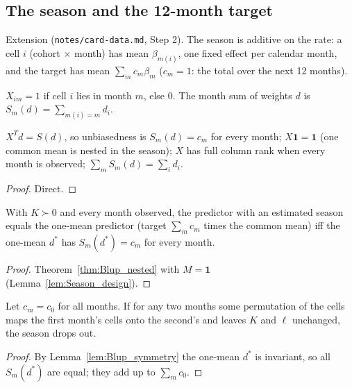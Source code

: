 \subsection*{The season and the 12-month target}

Extension (\texttt{notes/card-data.md}, Step 2). The season is additive on the rate: a cell
$i$ (cohort $\times$ month) has mean $\beta_{m(i)}$, one fixed effect per calendar month, and the
target has mean $\sum_m c_m\beta_m$ ($c_m = 1$: the total over the next 12 months).

\begin{definition}\label{def:Season}
  \leanok
  $X_{im} = 1$ if cell $i$ lies in month $m$, else $0$. The month sum of weights $d$ is
  $S_m(d) = \sum_{m(i) = m} d_i$.
\end{definition}

\begin{lemma}\label{lem:Season_design}
  \leanok
  $X^Td = S(d)$, so unbiasedness is $S_m(d) = c_m$ for every month; $X\mathbf 1 = \mathbf 1$
  (one common mean is nested in the season); $X$ has full column rank when every month is
  observed; $\sum_m S_m(d) = \sum_i d_i$.
\end{lemma}
\begin{proof}
  \leanok
  Direct.
\end{proof}

\begin{theorem}\label{thm:Season_eq_iff}
  \leanok
  With $K \succ 0$ and every month observed, the predictor with an estimated season equals the
  one-mean predictor (target $\sum_m c_m$ times the common mean) iff the one-mean $d^*$ has
  $S_m(d^*) = c_m$ for every month.
\end{theorem}
\begin{proof}
  \leanok
  Theorem~\ref{thm:Blup_nested} with $M = \mathbf 1$ (Lemma~\ref{lem:Season_design}).
\end{proof}

\begin{corollary}\label{cor:Season_interchangeable}
  \leanok
  Let $c_m = c_0$ for all months. If for any two months some permutation of the cells maps the
  first month's cells onto the second's and leaves $K$ and $\ell$ unchanged, the season drops
  out.
\end{corollary}
\begin{proof}
  \leanok
  By Lemma~\ref{lem:Blup_symmetry} the one-mean $d^*$ is invariant, so all $S_m(d^*)$ are
  equal; they add up to $\sum_m c_0$.
\end{proof}

